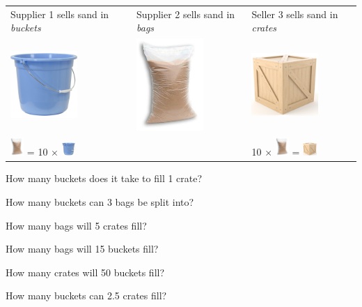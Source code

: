 \documentclass[12pt]{exam}
\begin{document}
\begin{questions}
\noindent\begin{tabularx}{\textwidth}{ X | X | X }
	Supplier 1 sells sand in \textit{buckets} & Supplier 2 sells sand in \textit{bags} & Seller 3 sells sand in \textit{crates} \\
	\includegraphics[width=1in]{../images/bucket.jpeg} 
	& \includegraphics[width = 1in]{../images/sand_bag.jpg} 
	& \includegraphics[width=1in]{../images/crate.jpg} \\
	\includegraphics[width=0.2in]{../images/sand_bag.jpg} = 10 $\times$  \includegraphics[width = 0.2in]{../images/bucket.jpeg}
	&
	& 10 $\times$  \includegraphics[width = 0.2in]{../images/sand_bag.jpg} = \includegraphics[width=0.21in]{../images/crate.jpg} \\
\end{tabularx}
\vspace{1in}
\begin{parts}
	\item How many buckets does it take to fill 1 crate?
		\vspace{0.4in}
	\item How many buckets can 3 bags be split into?
		\vspace{0.4in}
	\item How many bags will 5 crates fill?
		\vspace{0.4in}
	\item How many bags will 15 buckets fill?
		\vspace{0.4in}
	\item How many crates will 50 buckets fill?
		\vspace{0.4in}
	\item How many buckets can 2.5 crates fill?
		\vspace{0.4in}
		

\end{parts}
\end{questions}
\end{document}
